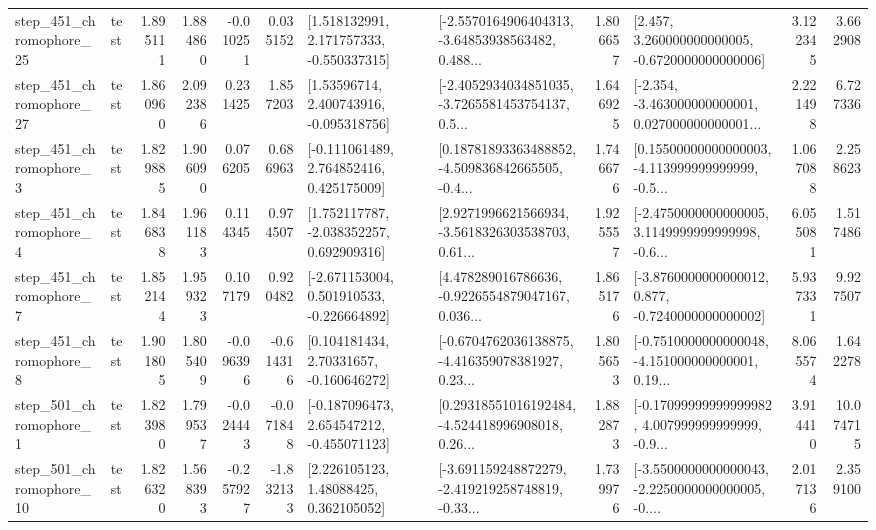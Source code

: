\begin{tabular}{llrrrrllrlrr}
  step\_451\_chromophore\_25 &      test &      1.895111 &    1.884860 &     -0.010251 &  0.035152 &    [1.518132991, 2.171757333, -0.550337315] &  [-2.5570164906404313, -3.64853938563482, 0.488... &       1.806657 &    [2.457, 3.260000000000005, -0.6720000000000006] &            3.122345 &          3.662908 \\
  step\_451\_chromophore\_27 &      test &      1.860960 &    2.092386 &      0.231425 &  1.857203 &     [1.53596714, 2.400743916, -0.095318756] &  [-2.4052934034851035, -3.7265581453754137, 0.5... &       1.646925 &  [-2.354, -3.463000000000001, 0.027000000000001... &            2.221498 &          6.727336 \\
   step\_451\_chromophore\_3 &      test &      1.829885 &    1.906090 &      0.076205 &  0.686963 &    [-0.111061489, 2.764852416, 0.425175009] &  [0.18781893363488852, -4.509836842665505, -0.4... &       1.746676 &  [0.15500000000000003, -4.113999999999999, -0.5... &            1.067088 &          2.258623 \\
   step\_451\_chromophore\_4 &      test &      1.846838 &    1.961183 &      0.114345 &  0.974507 &    [1.752117787, -2.038352257, 0.692909316] &  [2.9271996621566934, -3.5618326303538703, 0.61... &       1.925557 &  [-2.4750000000000005, 3.1149999999999998, -0.6... &            6.055081 &          1.517486 \\
   step\_451\_chromophore\_7 &      test &      1.852144 &    1.959323 &      0.107179 &  0.920482 &   [-2.671153004, 0.501910533, -0.226664892] &  [4.478289016786636, -0.9226554879047167, 0.036... &       1.865176 &  [-3.8760000000000012, 0.877, -0.7240000000000002] &            5.937331 &          9.927507 \\
   step\_451\_chromophore\_8 &      test &      1.901805 &    1.805409 &     -0.096396 & -0.614316 &     [0.104181434, 2.70331657, -0.160646272] &  [-0.6704762036138875, -4.416359078381927, 0.23... &       1.805653 &  [-0.7510000000000048, -4.151000000000001, 0.19... &            8.065574 &          1.642278 \\
   step\_501\_chromophore\_1 &      test &      1.823980 &    1.799537 &     -0.024443 & -0.071848 &   [-0.187096473, 2.654547212, -0.455071123] &  [0.29318551016192484, -4.524418996908018, 0.26... &       1.882873 &  [-0.17099999999999982, 4.007999999999999, -0.9... &            3.914410 &         10.074715 \\
  step\_501\_chromophore\_10 &      test &      1.826320 &    1.568393 &     -0.257927 & -1.832133 &      [2.226105123, 1.48088425, 0.362105052] &  [-3.691159248872279, -2.419219258748819, -0.33... &       1.739976 &  [-3.5500000000000043, -2.2250000000000005, -0.... &            2.017136 &          2.359100 \\

\end{tabular}
